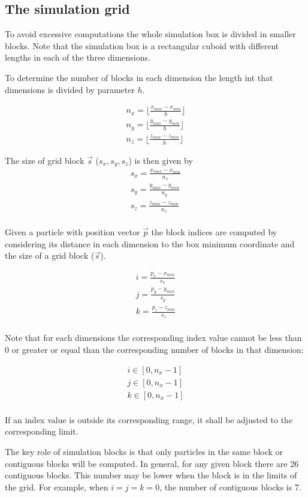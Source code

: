 \subsection{The simulation grid}

To avoid excessive computations the whole simulation box is divided in smaller
blocks. Note that the simulation box is a rectangular cuboid with different
lengths in each of the three dimensions. 

To determine the number of blocks in each dimension the length int that
dimensions is divided by parameter $h$.

\[
\begin{split}
n_x = \lfloor \frac{x_{max}- x_{min}}{h} \rfloor\\
n_y = \lfloor \frac{y_{max}- y_{min}}{h} \rfloor\\
n_z = \lfloor \frac{z_{max}- z_{min}}{h} \rfloor
\end{split}
\]

The size of grid block $\vec{s}$ ($s_x, s_y, s_z$) is then given by
\[
\begin{split}
s_x = \frac{x_{max} - x_{min}}{n_x}\\
s_y = \frac{y_{max} - y_{min}}{n_y}\\
s_z = \frac{z_{max} - z_{min}}{n_z}\\
\end{split}
\] 

Given a particle with position vector $\vec{p}$ the block indices are computed
by considering its distance in each dimension to the box minimum coordinate
and the size of a grid block ($\vec{s}$).

\[
\begin{split}
i = \frac{p_x - x_{min}}{s_x}\\
j = \frac{p_y - y_{min}}{s_y}\\
k = \frac{p_z - z_{min}}{s_z}\\
\end{split}
\]

Note that for each dimensions the corresponding index value cannot be less than
$0$ or greater or equal than the corresponding number of blocks in that
dimension:

\[
\begin{split}
i \in [0, n_x-1]\\
j \in [0, n_x-1]\\
k \in [0, n_x-1]\\
\end{split}
\]

If an index value is outside its corresponding range, it shall be adjusted to
the corresponding limit.

The key role of simulation blocks is that only particles in the same block or
contiguous blocks will be computed. In general, for any given block there are
26 contiguous blocks. This number may be lower when the block is in the limits
of the grid. For example, when $i=j=k=0$, the number of contiguous blocks is 7.
